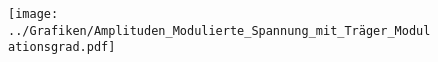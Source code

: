 
\FloatBarrier\begin{figure}[!h]
\centering
\texttt{[image: ../Grafiken/Amplituden\_Modulierte\_Spannung\_mit\_Träger\_Modulationsgrad.pdf]}
\caption{\label{fig:amplituden_modulierte_spannung_mit_träger_modulationsgrad}}
\end{figure}
\FloatBarrier